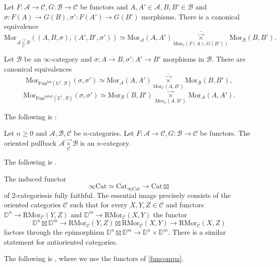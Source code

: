 \documentclass[10pt,oneside]{article}
\numberwithin{equation}{section} %
\numberwithin{figure}{section} %
\theoremstyle{plain}
\theoremstyle{definition}
\newcommand{\bD}{{\mathbb D}}
\newcommand{\mA}{{\mathcal A}}
\newcommand{\mB}{{\mathcal B}}
\newcommand{\mC}{{\mathcal C}}
\newcommand{\A}{A}
\newcommand{\F}{{F}}
\newcommand{\G}{{G}}
\newcommand{\R}{{\mathrm R}}
\newcommand{\Cat}{\mathrm{Cat}}
\newcommand{\Fun}{\mathrm{Fun}}
\newcommand{\lax}{{\mathrm{lax}}}
\newcommand{\oplax}{{\mathrm{oplax}}}
\newcommand{\Mor}{{\mathrm{Mor}}}
\begin{document}
\begin{corollary}\label{homso}

Let $\F: \mA \to \mC,\G: \mB \to \mC$ be functors and $\A,\A'\in \mA, B,B' \in \mB$ and $\sigma: \F(\A)\to \G(B), \sigma': \F(\A')\to \G(B')$ morphisms. There is a canonical equivalence $$\Mor_{\mA\underset{\mC}{\bar{\vec{\times}}} \mB}((\A,B, \sigma),(\A',B', \sigma')) \simeq \Mor_\mA(\A,\A')\underset{\Mor_\mC(\F(\A),\G(B'))}{\bar{\vec{\times}}} \Mor_\mB(B,B').$$

\end{corollary}

\begin{corollary}\label{homs2}\label{homso2} Let $\mB$ be an $\infty$-category and $\sigma: \A \to B, \sigma': \A' \to B'$ morphisms in $\mB$. There are canonical equivalences $$\Mor_{\Fun^\lax(\bD^1,\mB)}(\sigma, \sigma') \simeq \Mor_\mA(\A,\A')\underset{\Mor_\mC(\A,B')}{\bar{\vec{\times}}} \Mor_\mB(B,B'), $$
$$\Mor_{\Fun^\oplax(\bD^1,\mB)}(\sigma, \sigma') \simeq {\Mor_\mB(B,B') \,\underset{\Mor_\mC(\A,B')}{\vec{\times}}}\, \Mor_{\mA}(\A,\A'). $$\end{corollary}

The following is \cite[Corollary 2.3.25.]{gepner2026fibrations}:

\begin{corollary}\label{dimensio}

Let $ n \geq 0$ and $\mA,\mB,\mC$ be $n$-categories.
Let $\F: \mA \to \mC,\G: \mB \to \mC$ be functors.
The oriented pullback $\mA\underset{\mC}{\vec{\times}} \mB$
is an $n$-category.
    
\end{corollary}


The following is \cite[Theorem 4.2.7.]{oriented}.

\begin{theorem}\label{interchange}
The induced functor $$\infty\Cat\simeq\Cat_{\infty\Cat} \to {\Cat\boxtimes} $$ of 2-categoriesis fully faithful. The essential image precisely consists of the oriented categories $\mC$ such that 
for every $X,Y,Z \in \mC$ and functors $\bD^n \to \R\Mor_\mC(Y,Z)$ and $\bD^m \to \R\Mor_\mC(X,Y)$
the functor $$\bD^n \boxtimes \bD^m \to \R\Mor_\mC(Y,Z) \boxtimes \R\Mor_\mC(X,Y) \to \R\Mor_\mC(X,Z)$$ factors through the epimorphism
$\bD^n \boxtimes \bD^m \to \bD^n \times \bD^m.$ 
There is a similar statement for antioriented categories.
\end{theorem}

The following is \cite[Theorem 4.1.9.]{oriented}, where we use the functors of \cref{funcompa}.
\end{document}

